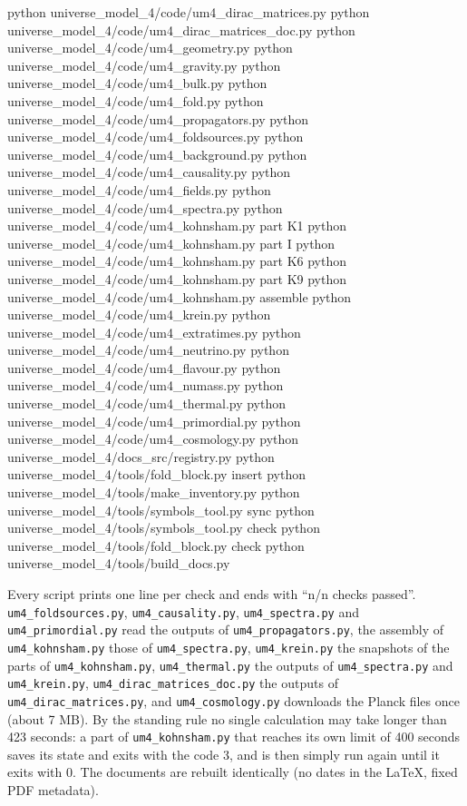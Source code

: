\documentclass[
  10pt,
]{article}
\newenvironment{Shaded}{}{}
\newcommand{\NormalTok}[1]{#1}
\begin{document}
\begin{Shaded}
\begin{Highlighting}[]
\NormalTok{python universe\_model\_4/code/um4\_dirac\_matrices.py}
\NormalTok{python universe\_model\_4/code/um4\_dirac\_matrices\_doc.py}
\NormalTok{python universe\_model\_4/code/um4\_geometry.py}
\NormalTok{python universe\_model\_4/code/um4\_gravity.py}
\NormalTok{python universe\_model\_4/code/um4\_bulk.py}
\NormalTok{python universe\_model\_4/code/um4\_fold.py}
\NormalTok{python universe\_model\_4/code/um4\_propagators.py}
\NormalTok{python universe\_model\_4/code/um4\_foldsources.py}
\NormalTok{python universe\_model\_4/code/um4\_background.py}
\NormalTok{python universe\_model\_4/code/um4\_causality.py}
\NormalTok{python universe\_model\_4/code/um4\_fields.py}
\NormalTok{python universe\_model\_4/code/um4\_spectra.py}
\NormalTok{python universe\_model\_4/code/um4\_kohnsham.py part K1}
\NormalTok{python universe\_model\_4/code/um4\_kohnsham.py part I}
\NormalTok{python universe\_model\_4/code/um4\_kohnsham.py part K6}
\NormalTok{python universe\_model\_4/code/um4\_kohnsham.py part K9}
\NormalTok{python universe\_model\_4/code/um4\_kohnsham.py assemble}
\NormalTok{python universe\_model\_4/code/um4\_krein.py}
\NormalTok{python universe\_model\_4/code/um4\_extratimes.py}
\NormalTok{python universe\_model\_4/code/um4\_neutrino.py}
\NormalTok{python universe\_model\_4/code/um4\_flavour.py}
\NormalTok{python universe\_model\_4/code/um4\_numass.py}
\NormalTok{python universe\_model\_4/code/um4\_thermal.py}
\NormalTok{python universe\_model\_4/code/um4\_primordial.py}
\NormalTok{python universe\_model\_4/code/um4\_cosmology.py}
\NormalTok{python universe\_model\_4/docs\_src/registry.py}
\NormalTok{python universe\_model\_4/tools/fold\_block.py insert}
\NormalTok{python universe\_model\_4/tools/make\_inventory.py}
\NormalTok{python universe\_model\_4/tools/symbols\_tool.py sync}
\NormalTok{python universe\_model\_4/tools/symbols\_tool.py check}
\NormalTok{python universe\_model\_4/tools/fold\_block.py check}
\NormalTok{python universe\_model\_4/tools/build\_docs.py}
\end{Highlighting}
\end{Shaded}

Every script prints one line per check and ends with ``n/n checks
passed''. \texttt{um4\_foldsources.py}, \texttt{um4\_causality.py},
\texttt{um4\_spectra.py} and \texttt{um4\_primordial.py} read the
outputs of \texttt{um4\_propagators.py}, the assembly of
\texttt{um4\_kohnsham.py} those of \texttt{um4\_spectra.py},
\texttt{um4\_krein.py} the snapshots of the parts of
\texttt{um4\_kohnsham.py}, \texttt{um4\_thermal.py} the outputs of
\texttt{um4\_spectra.py} and \texttt{um4\_krein.py},
\texttt{um4\_dirac\_matrices\_doc.py} the outputs of
\texttt{um4\_dirac\_matrices.py}, and \texttt{um4\_cosmology.py}
downloads the Planck files once (about 7 MB). By the standing rule no
single calculation may take longer than 423 seconds: a part of
\texttt{um4\_kohnsham.py} that reaches its own limit of 400 seconds
saves its state and exits with the code 3, and is then simply run again
until it exits with 0. The documents are rebuilt identically (no dates
in the LaTeX, fixed PDF metadata).
\end{document}
